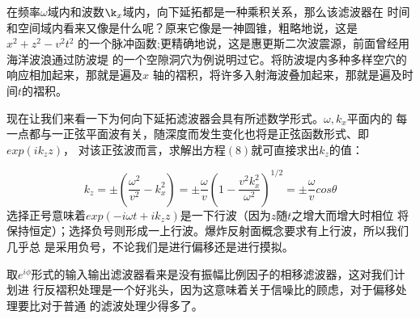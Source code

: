 
在频率$\omega$域内和波数$\k_{x}$域内，向下延拓都是一种乘积关系，那么该滤波器在
时间和空间域内看来又像是什么呢？原来它像是一神圆锥，粗略地说，这是$x^{2}+z^{2}-v^{2}t^{2}$
的一个脉冲函数;更精确地说，这是惠更斯二次波震源，前面曾经用海洋波浪通过防波堤
的一个空隙洞穴为例说明过它。将防波堤内多种多样空穴的响应相加起来，那就是遍及$x$
轴的褶积，将许多入射海波叠加起来，那就是遍及时间$t$的褶积。

现在让我们来看一下为何向下延拓滤波器会具有所述数学形式。$\omega,k_{x}$平面内的
每一点都与一正弦平面波有关，随深度而发生变化也将是正弦函数形式、即$exp(ik_{z}z)$，
对该正弦波而言，求解出方程$(8)$就可直接求出$k_{z}$的值：

\begin{subequations}\label{eq:ex1.2.11}
\begin{equation}
k_{z}=\pm(\frac{\omega^2}{v^2}-k_{x}^{2})　\label{eq:ex1.2.11a}
\end{equation}
\begin{equation}
 =\pm \frac{\omega}{v}(1-\frac{v^2k_{x}^{2}}{\omega^{2}})^{1/2} \label{eq:ex1.2.11b}
\end{equation}
\begin{equation}
 =\pm \frac{\omega}{v}cos\theta \label{eq:ex1.2.11c}
\end{equation}
\end{subequations}
选择正号意味着$exp(-i\omega t+ik_{z}z)$是一下行波（因为$z$随$t$之增大而增大时相位
将保持恒定）；选择负号则形成一上行波。爆炸反射面概念要求有上行波，所以我们几乎总
是采用负号，不论我们是进行偏移还是进行摸拟。

取$e^{i\phi}$形式的输入输出滤波器看来是没有振幅比例因子的相移滤波器，这对我们计划进
行反褶积处理是一个好兆头，因为这意味着关于信噪比的顾虑，对于偏移处理要比对于普通
的滤波处理少得多了。

